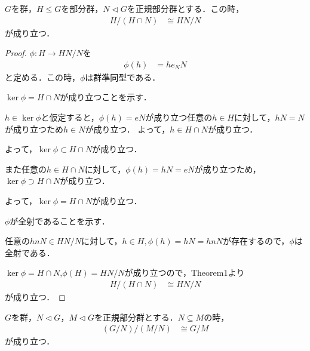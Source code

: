 \begin{theorem}

$G$を群，$H \leq   G$を部分群，$N\lhd G$を正規部分群とする．この時，
\begin{align}
    H/(H\cap N) &\cong HN/N
\end{align}
が成り立つ．
\end{theorem}
\begin{proof}
    $\phi : H\to HN/N$を
    \begin{align}
        \phi(h) &= he_N N
    \end{align}
    と定める．この時，$\phi$は群準同型である．  

    $\ker\phi=H\cap N$が成り立つことを示す．

    $h \in \ker\phi$と仮定すると，$\phi(h)=eN$が成り立つ任意の$h\in H$に対して，$hN=N$が成り立つため$h\in N$が成り立つ．
    よって，$h\in H\cap N$が成り立つ．

    よって，$\ker\phi\subset H\cap N$が成り立つ．

    また任意の$h\in H\cap N$に対して，$\phi(h)=hN=eN$が成り立つため，$\ker\phi\supset H\cap N$が成り立つ．

    よって，$\ker\phi=H\cap N$が成り立つ．

    $\phi$が全射であることを示す．
    
    任意の$hnN\in HN/N$に対して，$h\in H,\phi(h)=hN=hnN$が存在するので，$\phi$は全射である．

    $\ker\phi=H\cap N$,$\phi(H)=HN/N$が成り立つので，Theorem1より
    \begin{align}
        H/(H\cap N) &\cong HN/N
    \end{align}
    が成り立つ．
\end{proof}
\begin{theorem}
$G$を群，$N\lhd G$，$M\lhd G$を正規部分群とする．$N\subseteq M$の時，
\begin{align}
    (G/N)/(M/N) &\cong G/M
\end{align}
が成り立つ．
\end{theorem}
